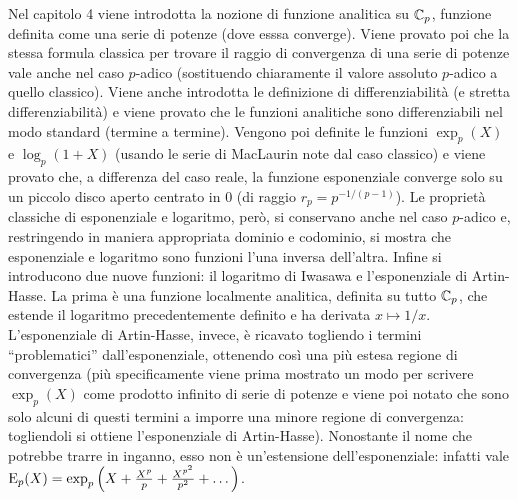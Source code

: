 	Nel capitolo 4 viene introdotta la nozione di funzione analitica su $\mathbb{C}_p$, funzione definita come una serie di potenze (dove esssa converge). Viene provato poi che la stessa formula classica per trovare il raggio di convergenza di una serie di potenze vale anche nel caso $p$-adico (sostituendo chiaramente il valore assoluto $p$-adico a quello classico). Viene anche introdotta le definizione di differenziabilità (e stretta differenziabilità) e viene provato che le funzioni analitiche sono differenziabili nel modo standard (termine a termine). Vengono poi definite le funzioni $\exp_p(X)$ e $\log_p(1 + X)$ (usando le serie di MacLaurin note dal caso classico) e viene provato che, a differenza del caso reale, la funzione esponenziale converge solo su un piccolo disco aperto centrato in 0 (di raggio $r_p = p^{-1/(p-1)}$). Le proprietà classiche di esponenziale e logaritmo, però, si conservano anche nel caso $p$-adico e, restringendo in maniera appropriata dominio e codominio, si mostra che esponenziale e logaritmo sono funzioni l'una inversa dell'altra. Infine si introducono due nuove funzioni: il logaritmo di Iwasawa e l'esponenziale di Artin-Hasse. La prima è una funzione localmente analitica, definita su tutto $\mathbb{C}_p$, che estende il logaritmo precedentemente definito e ha derivata $x \mapsto 1/x$. L'esponenziale di Artin-Hasse, invece, è ricavato togliendo i termini ``problematici'' dall'esponenziale, ottenendo così una più estesa regione di convergenza (più specificamente viene prima mostrato un modo per scrivere $\exp_p(X)$ come prodotto infinito di serie di potenze e viene poi notato che sono solo alcuni di questi termini a imporre una minore regione di convergenza: togliendoli si ottiene l'esponenziale di Artin-Hasse). Nonostante il nome che potrebbe trarre in inganno, esso non è un'estensione dell'esponenziale: infatti vale $\mathrm{E}_p(X) = \exp_p\left(X + \tfrac{X^p}{p} + \tfrac{X^{p^2}}{p^2} + \dots\right)$. \newline
